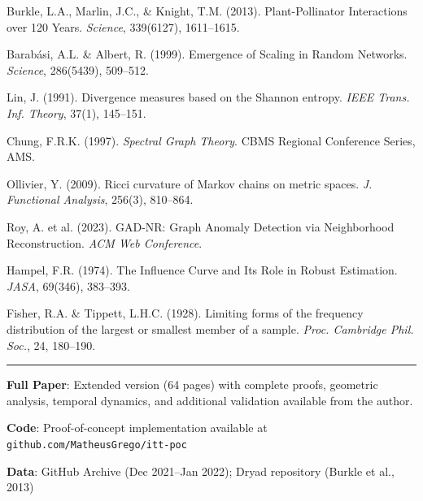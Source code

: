 \documentclass[11pt,a4paper]{article}
\theoremstyle{definition}
\theoremstyle{remark}
\begin{document}
\begin{enumerate}[label={[\arabic*]}, leftmargin=*, noitemsep]
    \item Burkle, L.A., Marlin, J.C., \& Knight, T.M. (2013). Plant-Pollinator Interactions over 120 Years. \textit{Science}, 339(6127), 1611--1615.
    
    \item Barabási, A.L. \& Albert, R. (1999). Emergence of Scaling in Random Networks. \textit{Science}, 286(5439), 509--512.
    
    \item Lin, J. (1991). Divergence measures based on the Shannon entropy. \textit{IEEE Trans. Inf. Theory}, 37(1), 145--151.
    
    \item Chung, F.R.K. (1997). \textit{Spectral Graph Theory}. CBMS Regional Conference Series, AMS.
    
    \item Ollivier, Y. (2009). Ricci curvature of Markov chains on metric spaces. \textit{J. Functional Analysis}, 256(3), 810--864.
    
    \item Roy, A. et al. (2023). GAD-NR: Graph Anomaly Detection via Neighborhood Reconstruction. \textit{ACM Web Conference}.
    
    \item Hampel, F.R. (1974). The Influence Curve and Its Role in Robust Estimation. \textit{JASA}, 69(346), 383--393.
    
    \item Fisher, R.A. \& Tippett, L.H.C. (1928). Limiting forms of the frequency distribution of the largest or smallest member of a sample. \textit{Proc. Cambridge Phil. Soc.}, 24, 180--190.
\end{enumerate}

\vspace{1em}
\hrule
\vspace{0.5em}
\footnotesize
\textbf{Full Paper}: Extended version (64 pages) with complete proofs, geometric analysis, temporal dynamics, and additional validation available from the author.

\textbf{Code}: Proof-of-concept implementation available at \texttt{github.com/MatheusGrego/itt-poc}

\textbf{Data}: GitHub Archive (Dec 2021--Jan 2022); Dryad repository (Burkle et al., 2013)
\end{document}
